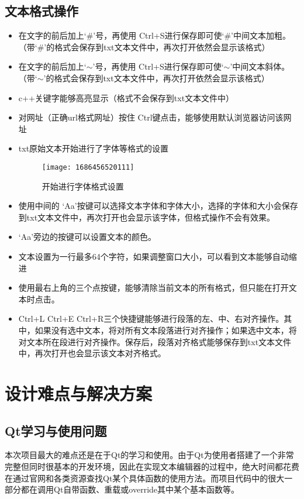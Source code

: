 \documentclass{./source/Report}
\begin{document}
\subsection{文本格式操作}
\begin{itemize}
    \item 在文字的前后加上‘\#’号，再使用 Ctrl+S进行保存即可使‘\#’中间文本加粗。（带‘\#’的格式会保存到txt文本文件中，再次打开依然会显示该格式）
    \item 在文字的前后加上‘$\sim$’号，再使用 Ctrl+S进行保存即可使‘$\sim$’中间文本斜体。（带‘$\sim$’的格式会保存到txt文本文件中，再次打开依然会显示该格式）
    \item c++关键字能够高亮显示（格式不会保存到txt文本文件中）
    \item 对网址（正确url格式网址）按住 Ctrl键点击，能够使用默认浏览器访问该网址
    \item txt原始文本开始进行了字体等格式的设置
    \begin{figure}[!htbp]
        \centering
        \begin{minipage}{0.45\textwidth}
            \centering
            \texttt{[image: 1686456520111]}
            \caption{开始进行字体格式设置}
        \end{minipage}
    \end{figure}
    \item 使用中间的 ‘Aa’按键可以选择文本字体和字体大小，选择的字体和大小会保存到txt文本文件中，再次打开也会显示该字体，但格式操作不会有效果。
    \item ‘Aa’旁边的按键可以设置文本的颜色。
    \item 文本设置为一行最多64个字符，如果调整窗口大小，可以看到文本能够自动缩进
    \item 使用最右上角的三个点按键，能够清除当前文本的所有格式，但只能在打开文本时点击。
    \item Ctrl+L Ctrl+E Ctrl+R三个快捷键能够进行段落的左、中、右对齐操作。其中，如果没有选中文本，将对所有文本段落进行对齐操作；如果选中文本，将对文本所在段进行对齐操作。保存后，段落对齐格式能够保存到txt文本文件中，再次打开也会显示该文本对齐格式。
\end{itemize}


\section{设计难点与解决方案}
\subsection{Qt学习与使用问题}
本次项目最大的难点还是在于Qt的学习和使用。由于Qt为使用者搭建了一个非常完整但同时很基本的开发环境，因此在实现文本编辑器的过程中，绝大时间都花费在通过官网和各类资源查找Qt某个具体函数的使用方法。而项目代码中的很大一部分都在调用Qt自带函数、重载或override其中某个基本函数等。
\end{document}
